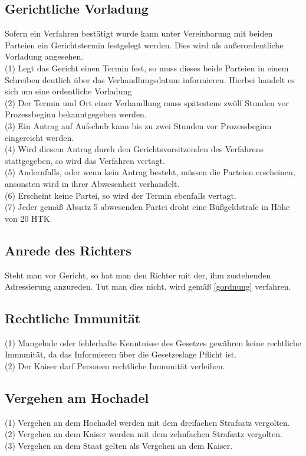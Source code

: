\documentclass{article}
\begin{document}
\subsection{Gerichtliche Vorladung}
Sofern ein Verfahren bestätigt wurde kann unter Vereinbarung mit beiden Parteien ein Gerichtstermin festgelegt werden. Dies wird als außerordentliche Vorladung angesehen.\\
(1) Legt das Gericht einen Termin fest, so muss dieses beide Parteien in einem Schreiben deutlich über das Verhandlungsdatum informieren. Hierbei handelt es sich um eine ordentliche Vorladung\\
(2) Der Termin und Ort einer Verhandlung muss spätestens zwölf Stunden vor Prozessbeginn bekanntgegeben werden.\\
(3) Ein Antrag auf Aufschub kann bis zu zwei Stunden vor Prozessbeginn eingereicht werden.\\
(4) Wird diesem Antrag durch den Gerichtsvorsitzenden des Verfahrens stattgegeben, so wird das Verfahren vertagt.\\
(5) Andernfalls, oder wenn kein Antrag besteht, müssen die Parteien erscheinen, ansonsten wird in ihrer Abwesenheit verhandelt.\\
(6) Erscheint keine Partei, so wird der Termin ebenfalls vertagt.\\
(7) Jeder gemäß Absatz 5 abwesenden Partei droht eine Bußgeldstrafe in Höhe von 20 HTK.\\

\subsection{Anrede des Richters}
Steht man vor Gericht, so hat man den Richter mit der, ihm zustehenden Adressierung anzureden. Tut man dies nicht, wird gemäß \ref{gordnung} verfahren.\\

\subsection{Rechtliche Immunität}
(1) Mangelnde oder fehlerhafte Kenntnisse des Gesetzes gewähren keine rechtliche Immunität, da das Informieren über die Gesetzeslage Pflicht ist.\\
(2) Der Kaiser darf Personen rechtliche Immunität verleihen.

\subsection{Vergehen am Hochadel}\label{vergehen}
(1) Vergehen an dem Hochadel werden mit dem dreifachen Strafsatz vergolten.\\
(2) Vergehen an dem Kaiser werden mit dem zehnfachen Strafsatz vergolten.\\
(3) Vergehen an dem Staat gelten als Vergehen an dem Kaiser.
\end{document}
